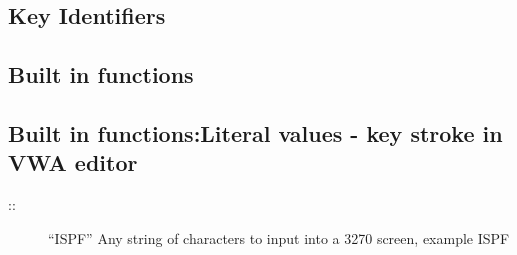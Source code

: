 \documentclass[letterpaper,10pt,english]{sphinxmanual}
\begin{document}
\subsection{Key Identifiers}
\label{\detokenize{Customization:key-identifiers}}
\begin{sphinxVerbatim}[commandchars=\\\{\}]
                                                               
                                               
 
\end{sphinxVerbatim}


\subsection{Built in functions}
\label{\detokenize{Customization:built-in-functions}}
\begin{sphinxVerbatim}[commandchars=\\\{\}]
            
\end{sphinxVerbatim}


\subsection{Built in functions:Literal values - key stroke in VWA editor}
\label{\detokenize{Customization:built-in-functions-literal-values-key-stroke-in-vwa-editor}}\begin{description}
\item[{::}] \leavevmode
“ISPF”          Any string of characters to input into a 3270 screen, example ISPF

\end{description}
\end{document}
